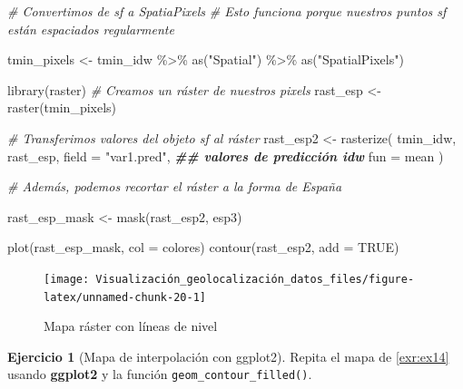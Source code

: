 \documentclass[
]{book}
\newenvironment{Shaded}{\begin{snugshade}}{\end{snugshade}}
\newcommand{\AttributeTok}[1]{\textcolor[rgb]{0.77,0.63,0.00}{#1}}
\newcommand{\CommentTok}[1]{\textcolor[rgb]{0.56,0.35,0.01}{\textit{#1}}}
\newcommand{\ConstantTok}[1]{\textcolor[rgb]{0.00,0.00,0.00}{#1}}
\newcommand{\DocumentationTok}[1]{\textcolor[rgb]{0.56,0.35,0.01}{\textbf{\textit{#1}}}}
\newcommand{\FunctionTok}[1]{\textcolor[rgb]{0.00,0.00,0.00}{#1}}
\newcommand{\NormalTok}[1]{#1}
\newcommand{\OtherTok}[1]{\textcolor[rgb]{0.56,0.35,0.01}{#1}}
\newcommand{\SpecialCharTok}[1]{\textcolor[rgb]{0.00,0.00,0.00}{#1}}
\newcommand{\StringTok}[1]{\textcolor[rgb]{0.31,0.60,0.02}{#1}}
\theoremstyle{definition}
\theoremstyle{definition}
\theoremstyle{definition}
\newtheorem{exercise}{Ejercicio}[chapter]
\theoremstyle{definition}
\theoremstyle{remark}
\begin{document}
\begin{Shaded}
\begin{Highlighting}[]
\CommentTok{\# Convertimos de sf a SpatiaPixels}
\CommentTok{\# Esto funciona porque nuestros puntos sf están espaciados regularmente}

\NormalTok{tmin\_pixels }\OtherTok{\textless{}{-}}\NormalTok{ tmin\_idw }\SpecialCharTok{\%\textgreater{}\%}
  \FunctionTok{as}\NormalTok{(}\StringTok{"Spatial"}\NormalTok{) }\SpecialCharTok{\%\textgreater{}\%}
  \FunctionTok{as}\NormalTok{(}\StringTok{"SpatialPixels"}\NormalTok{)}


\FunctionTok{library}\NormalTok{(raster)}
\CommentTok{\# Creamos un ráster de nuestros pixels}
\NormalTok{rast\_esp }\OtherTok{\textless{}{-}} \FunctionTok{raster}\NormalTok{(tmin\_pixels)}

\CommentTok{\# Transferimos valores del objeto sf al ráster}
\NormalTok{rast\_esp2 }\OtherTok{\textless{}{-}} \FunctionTok{rasterize}\NormalTok{(}
\NormalTok{  tmin\_idw,}
\NormalTok{  rast\_esp,}
  \AttributeTok{field =} \StringTok{"var1.pred"}\NormalTok{, }\DocumentationTok{\#\# valores de predicción idw}
  \AttributeTok{fun =}\NormalTok{ mean}
\NormalTok{)}

\CommentTok{\# Además, podemos recortar el ráster a la forma de España}

\NormalTok{rast\_esp\_mask }\OtherTok{\textless{}{-}} \FunctionTok{mask}\NormalTok{(rast\_esp2, esp3)}

\FunctionTok{plot}\NormalTok{(rast\_esp\_mask, }\AttributeTok{col =}\NormalTok{ colores)}
\FunctionTok{contour}\NormalTok{(rast\_esp2, }\AttributeTok{add =} \ConstantTok{TRUE}\NormalTok{)}
\end{Highlighting}
\end{Shaded}

\begin{figure}

{\centering \texttt{[image: Visualización\_geolocalización\_datos\_files/figure-latex/unnamed-chunk-20-1]} 

}

\caption{Mapa ráster con líneas de nivel}\label{fig:unnamed-chunk-20}
\end{figure}

\begin{exercise}[Mapa de interpolación con ggplot2]
\protect\hypertarget{exr:ex15}{}\label{exr:ex15}Repita el mapa de \ref{exr:ex14} usando \textbf{ggplot2} y la función
\texttt{geom\_contour\_filled()}.
\end{exercise}
\end{document}

